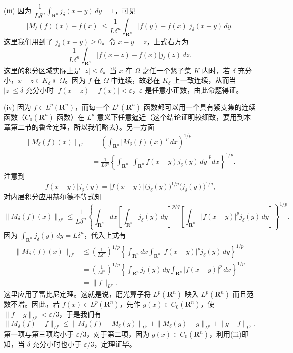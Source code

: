 (iii) 因为 $\dfrac1{L\delta^n}\int_{\mathbf R^n}j_\delta(x-y)\,dy=1$，可见
\[
 |M_\delta(f)(x)-f(x)|
 \le\frac1{L\delta^n}\int_{\mathbf R^n}|f(y)-f(x)|j_\delta(x-y)\,dy.
\]
这里我们用到了 $j_\delta(x-y)\ge0$。令 $x-y=z$，上式右方为
\[
 \frac1{L\delta^n}\int_{\mathbf R^n}|f(x-z)-f(x)|j_\delta(z)\,dz.
\]
这里的积分区域实际上是 $|z|\le\delta$。当 $x$ 在 $\Omega$ 之任一个紧子集 $K$ 内时，若 $\delta$ 充分小，$x-z\in K_\delta\Subset\Omega$。因为 $f$ 在 $\Omega$ 中连续，故必在 $K_\delta$ 上一致连续，从而当 $|z|\le\delta$ 充分小时 $|f(x-z)-f(x)|<\varepsilon$，$\varepsilon$ 是任意小正数，由此命题得证。

(iv) 因为 $f\in L^p(\mathbf R^n)$，而每一个 $L^p(\mathbf R^n)$ 函数都可以用一个具有紧支集的连续函数（$C_0(\mathbf R^n)$ 函数）在 $L^p$ 意义下任意逼近（这个结论证明较细致，要用到本章第二节的鲁金定理，所以我们略去）。另一方面
\[
\begin{aligned}
 \|M_\delta(f)(x)\|_{L^p}
 &=\left(\int_{\mathbf R^n}|M_\delta(f)(x)|^p\,dx\right)^{1/p}\\
 &=\frac1{L\delta^n}\left\{\int_{\mathbf R^n}
 \left|\int_{\mathbf R^n}f(x-y)j_\delta(y)\,dy\right|^pdx\right\}^{1/p}.
\end{aligned}
\]
注意到
\[
 |f(x-y)|j_\delta(y)
 =|f(x-y)|\bigl(j_\delta(y)\bigr)^{1/p}\bigl(j_\delta(y)\bigr)^{1/q},
\]
对内层积分应用赫尔德不等式知
\[
 \|M_\delta(f)(x)\|_{L^p}
 \le\frac1{L\delta^n}
 \left\{\int_{\mathbf R^n}dx\left[\int_{\mathbf R^n}j_\delta(y)\,dy\right]^{p/q}
 \left[\int_{\mathbf R^n}|f(x-y)|^p j_\delta(y)\,dy\right]\right\}^{1/p}.
\]
因为 $\int_{\mathbf R^n}j_\delta(y)\,dy=L\delta^n$，代入上式有
\[
\begin{aligned}
 \|M_\delta(f)(x)\|_{L^p}
 &\le\left(\frac1{L\delta^n}\right)^{1/p}
 \left\{\int_{\mathbf R^n}dx\int_{\mathbf R^n}|f(x-y)|^p j_\delta(y)\,dy\right\}^{1/p}\\
 &=\left(\frac1{L\delta^n}\right)^{1/p}
 \left\{\int_{\mathbf R^n}j_\delta(y)\,dy\int_{\mathbf R^n}|f(x-y)|^p\,dx\right\}^{1/p}\\
 &=\|f\|_{L^p}.
\end{aligned}
\]
这里应用了富比尼定理。这就是说，磨光算子将 $L^p(\mathbf R^n)$ 映入 $L^p(\mathbf R^n)$ 而且范数不增。因此，若 $f(x)\in L^p(\mathbf R^n)$，先作 $g(x)\in C_0(\mathbf R^n)$，使 $\|f-g\|_{L^p}<\varepsilon/3$，于是我们有
\[
 \|M_\delta(f)-f\|_{L^p}
 \le\|M_\delta(f)-M_\delta(g)\|_{L^p}
 +\|M_\delta(g)-g\|_{L^p}
 +\|g-f\|_{L^p}.
\]
第一项与第三项均小于 $\varepsilon/3$，对于第二项，因为 $g(x)\in C_0(\mathbf R^n)$，利用(iii)即知，当 $\delta$ 充分小时也小于 $\varepsilon/3$，定理证毕。

